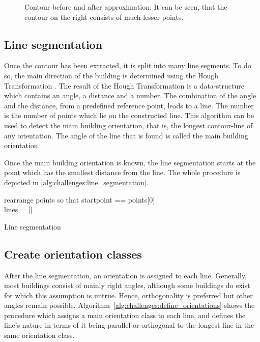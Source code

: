 \begin{figure}[H]
\begin{subfigure}{0.45\textwidth}
	\end{subfigure}
	\caption{Contour before and after approximation. It can be seen, that the contour on the right consists of much lesser points.}
	\label{fig:challenges:contour_approximation}
\end{figure}


\subsection{Line segmentation}
Once the contour has been extracted, it is split into many line segments. To do so, the main direction of the building is determined using the Hough Transformation \cite{Duda.1972}. The result of the Hough Transformation is a data-structure which contains an angle, a distance and a number. The combination of the angle and the distance, from a predefined reference point, leads to a line. The number is the number of points which lie on the constructed line. This algorithm can be used to detect the main building orientation, that is, the longest contour-line of any orientation. The angle of the line that is found is called the main building orientation.

Once the main building orientation is known, the line segmentation starts at the point which has the smallest distance from the line. The whole procedure is depicted in \autoref{alg:challenges:line_segmentation}.

\begin{algorithm}[H]
rearrange points so that startpoint == points[0]\\
lines = []\\
\caption{Line segmentation}
\label{alg:challenges:line_segmentation}
\end{algorithm}

\subsection{Create orientation classes}
After the line segmentation, an orientation is assigned to each line. Generally, most buildings consist of mainly right angles, although some buildings do exist for which this assumption is untrue. Hence, orthogonality is preferred but other angles remain possible. Algorithm~\ref{alg:challenges:define_orientations} shows the procedure which assigns a main orientation class to each line, and defines the line’s nature in terms of it being parallel or orthogonal to the longest line in the same orientation class.

